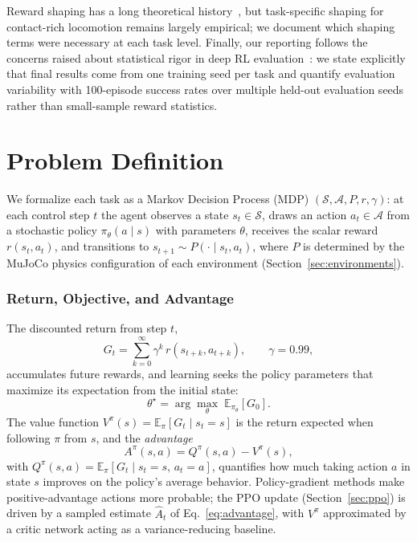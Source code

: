 \documentclass[conference,a4paper]{IEEEtran}
\begin{document}
Reward shaping has a long theoretical history~\cite{ng1999shaping}, but task-specific shaping for contact-rich locomotion remains largely empirical; we document which shaping terms were necessary at each task level. Finally, our reporting follows the concerns raised about statistical rigor in deep RL evaluation~\cite{henderson2018matters,agarwal2021precipice}: we state explicitly that final results come from one training seed per task and quantify evaluation variability with 100-episode success rates over multiple held-out evaluation seeds rather than small-sample reward statistics.

\section{Problem Definition}
\label{sec:mdp}

We formalize each task as a Markov Decision Process (MDP) $(\mathcal{S}, \mathcal{A}, P, r, \gamma)$: at each control step $t$ the agent observes a state $s_t \in \mathcal{S}$, draws an action $a_t \in \mathcal{A}$ from a stochastic policy $\pi_\theta(a \mid s)$ with parameters $\theta$, receives the scalar reward $r(s_t, a_t)$, and transitions to $s_{t+1} \sim P(\cdot \mid s_t, a_t)$, where $P$ is determined by the MuJoCo physics configuration of each environment (Section~\ref{sec:environments}).

\subsubsection{Return, Objective, and Advantage}
The discounted return from step $t$,
\begin{equation}
\label{eq:return}
G_t = \sum_{k=0}^{\infty} \gamma^k \, r(s_{t+k}, a_{t+k}), \qquad \gamma = 0.99,
\end{equation}
accumulates future rewards, and learning seeks the policy parameters that maximize its expectation from the initial state:
\begin{equation}
\label{eq:objective}
\theta^{\star} = \arg\max_\theta \; \mathbb{E}_{\pi_\theta}\!\left[ G_0 \right].
\end{equation}
The value function $V^{\pi}(s) = \mathbb{E}_{\pi}[G_t \mid s_t{=}s]$ is the return expected when following $\pi$ from $s$, and the \emph{advantage}
\begin{equation}
\label{eq:advantage}
A^{\pi}(s,a) = Q^{\pi}(s,a) - V^{\pi}(s),
\end{equation}
with $Q^{\pi}(s,a) = \mathbb{E}_{\pi}[G_t \mid s_t{=}s,\, a_t{=}a]$, quantifies how much taking action $a$ in state $s$ improves on the policy's average behavior. Policy-gradient methods make positive-advantage actions more probable; the PPO update (Section~\ref{sec:ppo}) is driven by a sampled estimate $\hat{A}_t$ of Eq.~\eqref{eq:advantage}, with $V^\pi$ approximated by a critic network acting as a variance-reducing baseline.
\end{document}
